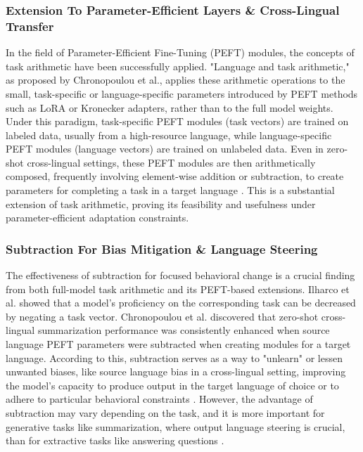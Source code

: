 \documentclass{DESSThesis}
\begin{document}
\subsubsection{Extension To Parameter-Efficient Layers \& Cross-Lingual Transfer}
In the field of Parameter-Efficient Fine-Tuning (PEFT) modules, the concepts of task arithmetic have been successfully applied. "Language and task arithmetic," as proposed by Chronopoulou et al., applies these arithmetic operations to the small, task-specific or language-specific parameters introduced by PEFT methods such as LoRA or Kronecker adapters, rather than to the full model weights. Under this paradigm, task-specific PEFT modules (task vectors) are trained on labeled data, usually from a high-resource language, while language-specific PEFT modules (language vectors) are trained on unlabeled data. Even in zero-shot cross-lingual settings, these PEFT modules are then arithmetically composed, frequently involving element-wise addition or subtraction, to create parameters for completing a task in a target language \cite{chronopoulou_language_2023}. This is a substantial extension of task arithmetic, proving its feasibility and usefulness under parameter-efficient adaptation constraints.

\subsubsection{Subtraction For Bias Mitigation \& Language Steering}
The effectiveness of subtraction for focused behavioral change is a crucial finding from both full-model task arithmetic and its PEFT-based extensions. Ilharco et al. showed that a model's proficiency on the corresponding task can be decreased by negating a task vector. Chronopoulou et al. discovered that zero-shot cross-lingual summarization performance was consistently enhanced when source language PEFT parameters were subtracted when creating modules for a target language. According to this, subtraction serves as a way to "unlearn" or lessen unwanted biases, like source language bias in a cross-lingual setting, improving the model's capacity to produce output in the target language of choice or to adhere to particular behavioral constraints \cite{chronopoulou_language_2023,ilharco_editing_2023}. However, the advantage of subtraction may vary depending on the task, and it is more important for generative tasks like summarization, where output language steering is crucial, than for extractive tasks like answering questions \cite{chronopoulou_language_2023}.
\end{document}
